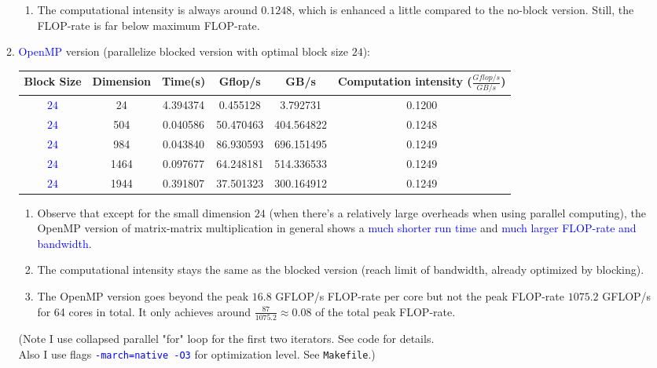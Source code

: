\documentclass[11pt]{article}
\begin{document}
\begin{enumerate}
\begin{enumerate}
\begin{enumerate}
                \item The computational intensity is always around $0.1248$, which is enhanced a little compared to the no-block version. Still, the FLOP-rate is far below maximum FLOP-rate.
                
            \end{enumerate}
            
            \item \textcolor{blue}{OpenMP} version (parallelize blocked version with optimal block size $24$):
            
            \begin{tabular}{c|c|c|c|c|c}
           Block Size & Dimension & Time(s) & Gflop/s & GB/s & Computation intensity ($\frac{Gflop/s}{GB/s}$) \\ \hline
            
            \textcolor{blue}{$24$} & 24 & 4.394374 & 0.455128 & 3.792731 & 0.1200 \\
            \textcolor{blue}{$24$} & 504 & 0.040586 & 50.470463 & 404.564822 & 0.1248 \\
            \textcolor{blue}{$24$} & 984 & 0.043840 & 86.930593 & 696.151495 & 0.1249 \\
            \textcolor{blue}{$24$} & 1464 & 0.097677 & 64.248181 & 514.336533 & 0.1249 \\
            \textcolor{blue}{$24$} & 1944 & 0.391807 & 37.501323 & 300.164912 & 0.1249 \\ \hline
            
            \end{tabular}
            \begin{enumerate}
                \item Observe that except for the small dimension $24$ (when there's a relatively large overheads when using parallel computing), the OpenMP version of matrix-matrix multiplication in general shows a \textcolor{blue}{much shorter run time} and \textcolor{blue}{much larger FLOP-rate and bandwidth}.
                \item The computational intensity stays the same as the blocked version (reach limit of bandwidth, already optimized by blocking).
                \item The OpenMP version goes beyond the peak $16.8$ GFLOP/s FLOP-rate per core but not the peak FLOP-rate $1075.2$ GFLOP/s for 64 cores in total. It only achieves around $\frac{87}{1075.2} \approx 0.08$ of the total peak FLOP-rate.
            \end{enumerate}
            (Note I use collapsed parallel "for" loop for the first two iterators. See code for details.\\
            Also I use flags \textcolor{blue}{\texttt{-march=native -O3}} for optimization level. See \texttt{Makefile}.)
      

\end{enumerate}
\end{enumerate}
\end{document}
